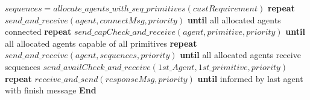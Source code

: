 \begin{algorithm}
\begin{algorithmic}[1]
\State \qquad $sequences = allocate\_agents\_with\_seq\_primitives(custRequirement)$
\State \qquad \textbf{repeat}
\State \qquad \qquad $send\_and\_receive(agent, connectMsg, priority)$
\State \qquad \textbf{until} all allocated agents connected
\State \qquad \textbf{repeat}
\State \qquad \qquad $send\_capCheck\_and\_receive(agent, primitive, priority)$
\State \qquad \textbf{until} all allocated agents capable of all primitives
\State \qquad \textbf{repeat}
\State \qquad \qquad $send\_and\_receive(agent, sequences, priority)$
\State \qquad \textbf{until} all allocated agents receive sequences
\State \qquad \qquad $send\_availCheck\_and\_receive(1st\_Agent, 1st\_primitive, priority)$
\State \qquad \textbf{repeat}
\State \qquad \qquad $receive\_and\_send(responseMsg, priority)$
\State \qquad \textbf{until} informed by last agent with finish message 
\State \textbf{End} 
\end{algorithmic}
\end{algorithm}

